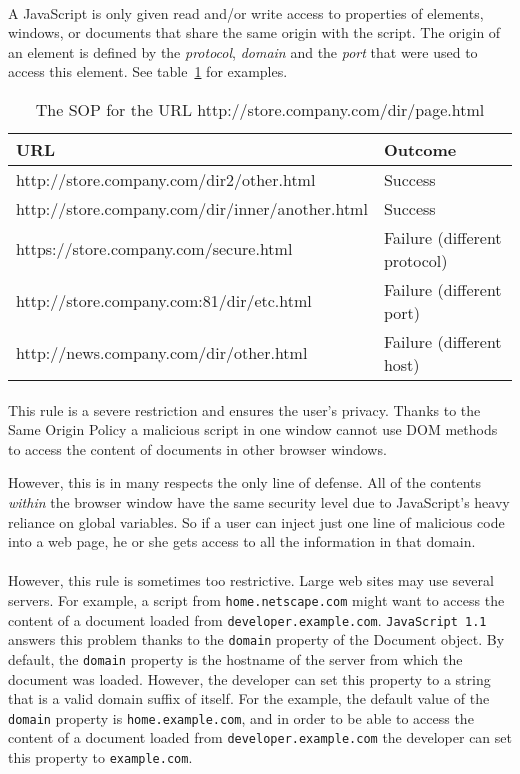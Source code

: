 \paragraph{}
    A JavaScript is only given read and/or write access to properties of elements, windows, or documents that share the same origin with the script. The origin of an element is defined by the \emph{protocol}, \emph{domain} and the \emph{port} that were used to access this element. See table~\ref{SOP} for examples. %
\begin{table}[h!]
\begin{tabular}{|l|l|}
      \hline
      URL & Outcome\\
      \hline\hline
    http://store.company.com/dir2/other.html        & Success \\
    http://store.company.com/dir/inner/another.html & Success \\
    https://store.company.com/secure.html           & Failure (different protocol) \\
    http://store.company.com:81/dir/etc.html        & Failure (different port) \\
    http://news.company.com/dir/other.html          & Failure (different host) \\      
      \hline
\end{tabular}
\caption{The SOP for the URL http://store.company.com/dir/page.html}\label{SOP}
\end{table}
\paragraph{}
This rule is a severe restriction and ensures the user's privacy. Thanks to the Same Origin Policy a malicious script in one window cannot use DOM methods to access the content of documents in other browser windows.

However, this is in many respects the only line of defense. All of the contents \emph{within} the browser window have the same security level due to JavaScript's heavy reliance on global variables. So if a user can inject just one line of malicious code into a web page, he or she gets access to all the information in that domain.

\paragraph{} %
However, this rule is sometimes too restrictive. Large web sites may use several servers. For example, a script from \texttt{home.netscape.com} might want to access the content of a document loaded from \texttt{developer.example.com}. \texttt{JavaScript 1.1} answers this problem thanks to the \texttt{domain} property of the Document object. By default, the \texttt{domain} property is the hostname of the server from which the document was loaded. However, the developer can set this property to a string that is a valid domain suffix of itself. For the example, the default value of the \texttt{domain} property is \texttt{home.example.com}, and in order to be able to access the content of a document loaded from \texttt{developer.example.com} the developer can set this property to \texttt{example.com}.
